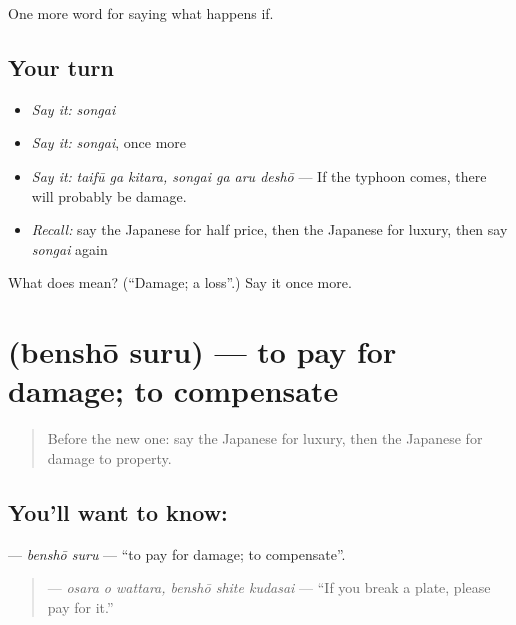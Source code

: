 \begin{grammarlens}[title={What you've built}]
One more word for saying what happens if.
\end{grammarlens}

\subsection*{Your turn}
\begin{itemize}
\raggedright
  \item \emph{Say it:} \emph{songai}
  \item \emph{Say it:} \emph{songai}, once more
  \item \emph{Say it:} \emph{taifū ga kitara, songai ga aru deshō} — If the typhoon comes, there will probably be damage.
  \item \emph{Recall:} say the Japanese for half price, then the Japanese for luxury, then say \emph{songai} again
\end{itemize}

\begin{tcolorbox}[breakable,colback=teal!4,colframe=teal!35!black,title={Before you move on}]
What does  mean? (\textquotedblleft{}Damage; a loss\textquotedblright{}.) Say it once more.
\end{tcolorbox}
\section[\texorpdfstring{\ja{べんしょうする} (benshō suru)}{べんしょうする (benshō suru)}]{ (benshō suru) — to pay for damage; to compensate}

\label{lesson:JA-C364-benshou-suru}



\begin{quote}
Before the new one: say the Japanese for luxury, then the Japanese for damage to property.
\end{quote}

\subsection*{You'll want to know: }
\textbf{} — \emph{benshō suru} — \textquotedblleft{}to pay for damage; to compensate\textquotedblright{}.

\begin{quote}
\textbf{  } — \emph{osara o wattara, benshō shite kudasai} — \textquotedblleft{}If you break a plate, please pay for it.\textquotedblright{}
\end{quote}

